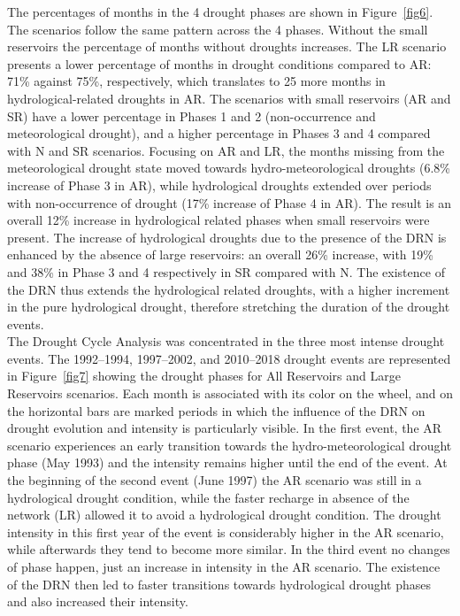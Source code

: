 \documentclass[draft]{agujournal2019}
\begin{document}
The percentages of months in the 4 drought phases are shown in Figure~\ref{fig6}. The scenarios follow the same pattern across the 4 phases. Without the small reservoirs the percentage of months without droughts increases. The LR scenario presents a lower percentage of months in drought conditions compared to AR: 71\% against 75\%, respectively, which translates to 25 more months in hydrological-related droughts in AR. The scenarios with small reservoirs (AR and SR) have a lower percentage in Phases 1 and 2 (non-occurrence and meteorological drought), and a higher percentage in Phases 3 and 4 compared with N and SR scenarios. Focusing on AR and LR, the months missing from the meteorological drought state moved towards hydro-meteorological droughts (6.8\% increase of Phase 3 in AR), while hydrological droughts extended over periods with non-occurrence of drought (17\% increase of Phase 4 in AR). The result is an overall 12\% increase in hydrological related phases when small reservoirs were present. The increase of hydrological droughts due to the presence of the DRN is enhanced by the absence of large reservoirs: an overall 26\% increase, with 19\% and 38\% in Phase 3 and 4 respectively in SR compared with N. The existence of the DRN thus extends the hydrological related droughts, with a higher increment in the pure hydrological drought, therefore stretching the duration of the drought events.\\
The Drought Cycle Analysis was concentrated in the three most intense drought events. The 1992–1994, 1997–2002, and 2010–2018 drought events are represented in Figure~\ref{fig7} showing the  drought phases for All Reservoirs and Large Reservoirs scenarios. Each month is associated with its color on the wheel, and on the horizontal bars are marked periods in which the influence of the DRN on drought evolution and intensity is particularly visible. In the first event, the AR scenario experiences an early transition towards the hydro-meteorological drought phase (May 1993) and the intensity remains higher until the end of the event. At the beginning of the second event (June 1997) the AR scenario was still in a hydrological drought condition, while the faster recharge in absence of the network (LR) allowed it to avoid a hydrological drought condition. The drought intensity in this first year of the event is considerably higher in the AR scenario, while afterwards they tend to become more similar. In the third event no changes of phase happen, just an increase in intensity in the AR scenario. The existence of the DRN then led to faster transitions towards hydrological drought phases and also increased their intensity.
\end{document}

